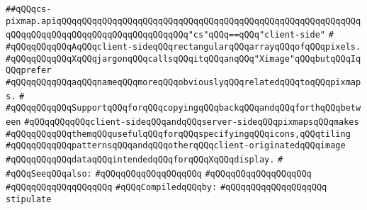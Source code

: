 \label{src/lib/x-kit/xclient/src/window/cs-pixmap.api}
\verb|##qQQqcs-pixmap.apiqQQqqQQqqQQqqQQqqQQqqQQqqQQqqQQqqQQqqQQqqQQqqQQqqQQqqQQqqQQqqQQqqQQqqQQqqQQqqQQqqQQqqQQqqQQqqQQq"cs"qQQq==qQQq"client-side"|\newline
\verb|#|\newline
\verb|#qQQqqQQqqQQqAqQQqclient-sideqQQqrectangularqQQqarrayqQQqofqQQqpixels.|\newline
\verb|#qQQqqQQqqQQqXqQQqjargonqQQqcallsqQQqitqQQqanqQQq"Ximage"qQQqbutqQQqIqQQqprefer|\newline
\verb|#qQQqqQQqqQQqaqQQqnameqQQqmoreqQQqobviouslyqQQqrelatedqQQqtoqQQqpixmaps.|\newline
\verb|#|\newline
\verb|#qQQqqQQqqQQqSupportqQQqforqQQqcopyingqQQqbackqQQqandqQQqforthqQQqbetween|\newline
\verb|#qQQqqQQqqQQqclient-sideqQQqandqQQqserver-sideqQQqpixmapsqQQqmakes|\newline
\verb|#qQQqqQQqqQQqthemqQQqusefulqQQqforqQQqspecifyingqQQqicons,qQQqtiling|\newline
\verb|#qQQqqQQqqQQqpatternsqQQqandqQQqotherqQQqclient-originatedqQQqimage|\newline
\verb|#qQQqqQQqqQQqdataqQQqintendedqQQqforqQQqXqQQqdisplay.|\newline
\verb|#|\newline
\verb|#qQQqSeeqQQqalso:|\newline
\verb|#qQQqqQQqqQQqqQQqqQQq|\newline
\verb|#qQQqqQQqqQQqqQQqqQQq|\newline
\verb|#qQQqqQQqqQQqqQQqqQQq|\newline
\newline
\verb|#qQQqCompiledqQQqby:|\newline
\verb|#qQQqqQQqqQQqqQQqqQQq|\newline
\newline
\newline
\newline
\newline
\verb|stipulate|\newline
